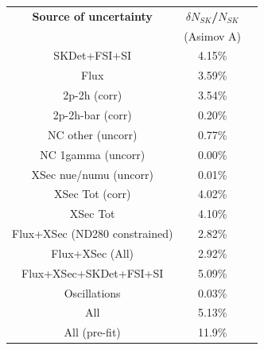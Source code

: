 \begin{table}[htb]
\centering
\begin{tabular}{| c | c | c |}
\hline
  {\bf Source of uncertainty}    & \multicolumn{1}{c|}{{\bf ${\delta}N_{SK}$/$N_{SK}$}}\\
                                 & \multicolumn{1}{c|}{(Asimov A)}\\

\hline
\hline
SKDet+FSI+SI                   & 4.15\%                        \\
\hline
\hline
  Flux                           & 3.59\%                        \\
\hline
\hline
  2p-2h (corr)                     & 3.54\%                        \\
  2p-2h-bar (corr)                  & 0.20\%                        \\
  NC other (uncorr)              & 0.77\%                        \\
  NC 1gamma (uncorr)             & 0.00\%                        \\
  XSec nue/numu (uncorr)                 & 0.01\%                        \\
\hline
  XSec Tot (corr)                  & 4.02\%                        \\
  XSec Tot                       & 4.10\%                        \\
\hline
\hline
  Flux+XSec (ND280 constrained)                      & 2.82\%                        \\
  Flux+XSec  (All)                    & 2.92\%                        \\
\hline
  Flux+XSec+SKDet+FSI+SI         & 5.09\%                        \\
\hline
\hline
  Oscillations                   & 0.03\%                        \\
\hline
\hline
  All                            & 5.13\%                        \\
    All (pre-fit) 		& 11.9\%				\\
\hline


\end{tabular}
\end{table}
